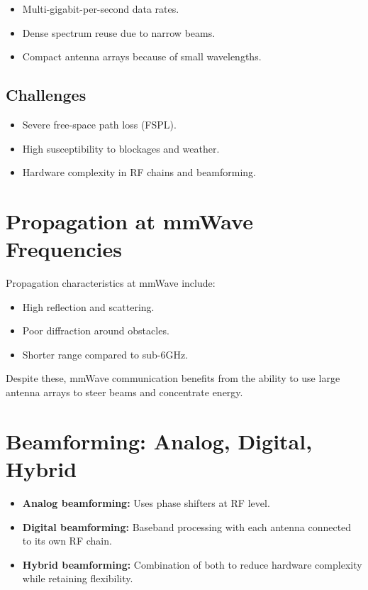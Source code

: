\begin{itemize}
  \item Multi-gigabit-per-second data rates.
  \item Dense spectrum reuse due to narrow beams.
  \item Compact antenna arrays because of small wavelengths.
\end{itemize}

\subsection{Challenges}
\begin{itemize}
  \item Severe free-space path loss (FSPL).
  \item High susceptibility to blockages and weather.
  \item Hardware complexity in RF chains and beamforming.
\end{itemize}

\section{Propagation at mmWave Frequencies}

Propagation characteristics at mmWave include:
\begin{itemize}
  \item High reflection and scattering.
  \item Poor diffraction around obstacles.
  \item Shorter range compared to sub-6GHz.
\end{itemize}

Despite these, mmWave communication benefits from the ability to use large antenna arrays to steer beams and concentrate energy.

\section{Beamforming: Analog, Digital, Hybrid}

\begin{itemize}
  \item \textbf{Analog beamforming:} Uses phase shifters at RF level.
  \item \textbf{Digital beamforming:} Baseband processing with each antenna connected to its own RF chain.
  \item \textbf{Hybrid beamforming:} Combination of both to reduce hardware complexity while retaining flexibility.
\end{itemize}

